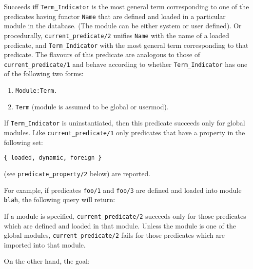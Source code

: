 \begin{description}
    Succeeds iff {\tt Term\_Indicator} is the most general term 
    corresponding to one of the predicates having functor {\tt Name} that are 
    defined and loaded in a particular module in the database. 
    (The module can be either system or user defined).
    Or procedurally, {\tt current\_predicate/2}
    unifies {\tt Name} with the name of a loaded predicate, and 
    {\tt Term\_Indicator} with the most general term corresponding to that
    predicate.  The flavours of this predicate are analogous to those of 
    {\tt current\_predicate/1} and behave according to whether 
    {\tt Term\_Indicator} has one of the following two forms:
    \begin{enumerate}
    \item{\tt Module:Term.}
    \item{\tt Term} (module is assumed to be global or usermod).
    \end{enumerate}
    If {\tt Term\_Indicator} is uninstantiated, then this predicate succeeds
    only for global modules. Like {\tt current\_predicate/1} only 
    predicates that have a property in the following set:
    \begin{center}
    {\tt \{ loaded, dynamic, foreign \} }
    \end{center}
    (see {\tt predicate\_property/2} below) are reported.

    For example, if predicates {\tt foo/1} and {\tt foo/3} are defined and
    loaded into module {\tt blah}, the following query will return:


    If a module is specified, {\tt current\_predicate/2} succeeds only for
    those predicates which are defined and loaded in that module. Unless 
    the module is one of the global modules, {\tt current\_predicate/2} fails
    for those predicates which are imported into that module.

    On the other hand, the goal:



\end{description}
